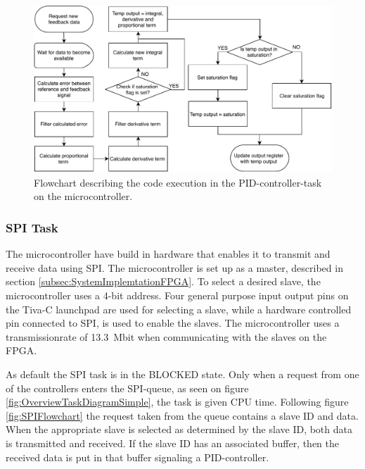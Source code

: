 \documentclass[../../main.tex]{subfiles}
\begin{document}
\begin{figure}[H]
    \centering
    \includegraphics[width=\textwidth]{Sections/System_Implementation/Images/PIDControllerFlowchart.pdf}
    \caption{Flowchart describing the code execution in the PID-controller-task on the microcontroller.}
    \label{fig:PIDControllerFlowchart}
\end{figure}





\subsubsection*{SPI Task}
The microcontroller have build in hardware that enables it to transmit and receive data using SPI. The microcontroller is set up as a master, described in section \ref{subsec:SystemImplemtationFPGA}. To select a desired slave, the microcontroller uses a 4-bit address. Four general purpose input output pins on the Tiva-C launchpad are used for selecting a slave, while a hardware controlled pin connected to SPI, is used to enable the slaves. The microcontroller uses a transmissionrate of \SI{13.3}{\mega bit} when communicating with the slaves on the FPGA. 

As default the SPI task is in the BLOCKED state. Only when a request from one of the controllers enters the SPI-queue, as seen on figure \ref{fig:OverviewTaskDiagramSimple}, the task is given CPU time. Following figure \ref{fig:SPIFlowchart} the request taken from the queue contains a slave ID and data. When the appropriate slave is selected as determined by the slave ID, both data is transmitted and received. If the slave ID has an associated buffer, then the received data is put in that buffer signaling a PID-controller.  
\end{document}
